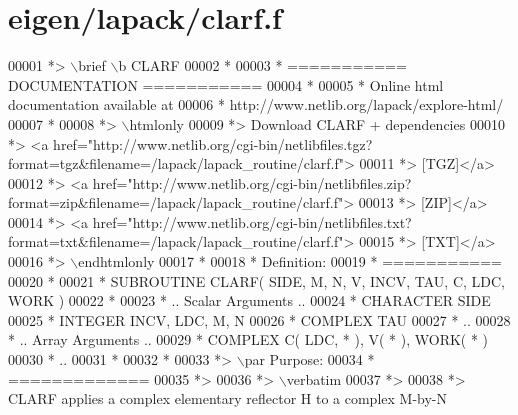 \hypertarget{eigen_2lapack_2clarf_8f_source}{}\section{eigen/lapack/clarf.f}
\label{eigen_2lapack_2clarf_8f_source}

\begin{DoxyCode}
00001 \textcolor{comment}{*> \(\backslash\)brief \(\backslash\)b CLARF}
00002 \textcolor{comment}{*}
00003 \textcolor{comment}{*  =========== DOCUMENTATION ===========}
00004 \textcolor{comment}{*}
00005 \textcolor{comment}{* Online html documentation available at }
00006 \textcolor{comment}{*            http://www.netlib.org/lapack/explore-html/ }
00007 \textcolor{comment}{*}
00008 \textcolor{comment}{*> \(\backslash\)htmlonly}
00009 \textcolor{comment}{*> Download CLARF + dependencies }
00010 \textcolor{comment}{*> <a
       href="http://www.netlib.org/cgi-bin/netlibfiles.tgz?format=tgz&filename=/lapack/lapack\_routine/clarf.f"> }
00011 \textcolor{comment}{*> [TGZ]</a> }
00012 \textcolor{comment}{*> <a
       href="http://www.netlib.org/cgi-bin/netlibfiles.zip?format=zip&filename=/lapack/lapack\_routine/clarf.f"> }
00013 \textcolor{comment}{*> [ZIP]</a> }
00014 \textcolor{comment}{*> <a
       href="http://www.netlib.org/cgi-bin/netlibfiles.txt?format=txt&filename=/lapack/lapack\_routine/clarf.f"> }
00015 \textcolor{comment}{*> [TXT]</a>}
00016 \textcolor{comment}{*> \(\backslash\)endhtmlonly }
00017 \textcolor{comment}{*}
00018 \textcolor{comment}{*  Definition:}
00019 \textcolor{comment}{*  ===========}
00020 \textcolor{comment}{*}
00021 \textcolor{comment}{*       SUBROUTINE CLARF( SIDE, M, N, V, INCV, TAU, C, LDC, WORK )}
00022 \textcolor{comment}{* }
00023 \textcolor{comment}{*       .. Scalar Arguments ..}
00024 \textcolor{comment}{*       CHARACTER          SIDE}
00025 \textcolor{comment}{*       INTEGER            INCV, LDC, M, N}
00026 \textcolor{comment}{*       COMPLEX            TAU}
00027 \textcolor{comment}{*       ..}
00028 \textcolor{comment}{*       .. Array Arguments ..}
00029 \textcolor{comment}{*       COMPLEX            C( LDC, * ), V( * ), WORK( * )}
00030 \textcolor{comment}{*       ..}
00031 \textcolor{comment}{*  }
00032 \textcolor{comment}{*}
00033 \textcolor{comment}{*> \(\backslash\)par Purpose:}
00034 \textcolor{comment}{*  =============}
00035 \textcolor{comment}{*>}
00036 \textcolor{comment}{*> \(\backslash\)verbatim}
00037 \textcolor{comment}{*>}
00038 \textcolor{comment}{*> CLARF applies a complex elementary reflector H to a complex M-by-N}

\end{DoxyCode}
